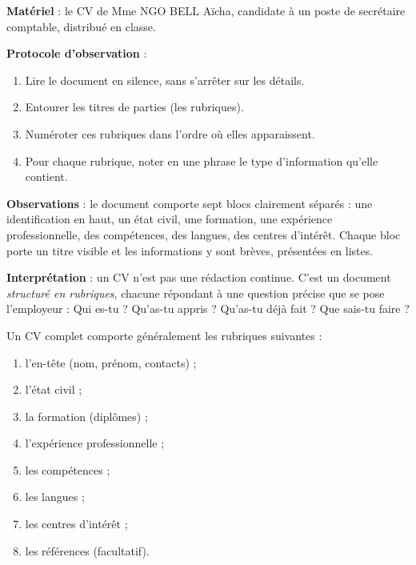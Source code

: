 \documentclass[11pt]{article}
\newcommand{\cle}[1]{{\popxbold\color{popdark}#1}}
\begin{document}
\begin{experience}
\textbf{Matériel} : le CV de Mme NGO BELL Aïcha, candidate à un poste de secrétaire comptable, distribué en classe.

\textbf{Protocole d'observation} :
\begin{enumerate}
\item Lire le document en silence, sans s'arrêter sur les détails.
\item Entourer les titres de parties (les rubriques).
\item Numéroter ces rubriques dans l'ordre où elles apparaissent.
\item Pour chaque rubrique, noter en une phrase le type d'information qu'elle contient.
\end{enumerate}

\textbf{Observations} : le document comporte sept blocs clairement séparés : une identification en haut, un état civil, une formation, une expérience professionnelle, des compétences, des langues, des centres d'intérêt. Chaque bloc porte un titre visible et les informations y sont brèves, présentées en listes.

\textbf{Interprétation} : un CV n'est pas une rédaction continue. C'est un document \emph{structuré en rubriques}, chacune répondant à une question précise que se pose l'employeur : Qui es-tu ? Qu'as-tu appris ? Qu'as-tu déjà fait ? Que sais-tu faire ?
\end{experience}

\begin{aretenir}
Un CV complet comporte généralement les rubriques suivantes :
\begin{enumerate}
\item l'\cle{en-tête} (nom, prénom, contacts) ;
\item l'\cle{état civil} ;
\item la \cle{formation} (diplômes) ;
\item l'\cle{expérience professionnelle} ;
\item les \cle{compétences} ;
\item les \cle{langues} ;
\item les \cle{centres d'intérêt} ;
\item les \cle{références} (facultatif).
\end{enumerate}
\end{aretenir}
\end{document}
